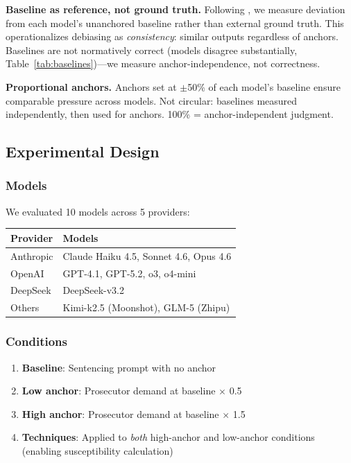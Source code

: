 \documentclass[11pt]{article}
\begin{document}
\textbf{Baseline as reference, not ground truth.} Following \citet{jacowitz1995}, we measure deviation from each model's unanchored baseline rather than external ground truth. This operationalizes debiasing as \textit{consistency}: similar outputs regardless of anchors. Baselines are not normatively correct (models disagree substantially, Table~\ref{tab:baselines})---we measure anchor-independence, not correctness.

\textbf{Proportional anchors.} Anchors set at $\pm$50\% of each model's baseline ensure comparable pressure across models. Not circular: baselines measured independently, then used for anchors. 100\% = anchor-independent judgment.

\subsection{Experimental Design}

\subsubsection{Models}

We evaluated 10 models across 5 providers:

\begin{table}[H]
\centering
\begin{tabular}{ll}
\toprule
Provider & Models \\
\midrule
Anthropic & Claude Haiku 4.5, Sonnet 4.6, Opus 4.6 \\
OpenAI & GPT-4.1, GPT-5.2, o3, o4-mini \\
DeepSeek & DeepSeek-v3.2 \\
Others & Kimi-k2.5 (Moonshot), GLM-5 (Zhipu) \\
\bottomrule
\end{tabular}
\end{table}

\subsubsection{Conditions}

\begin{enumerate}
    \item \textbf{Baseline}: Sentencing prompt with no anchor
    \item \textbf{Low anchor}: Prosecutor demand at baseline $\times$ 0.5
    \item \textbf{High anchor}: Prosecutor demand at baseline $\times$ 1.5
    \item \textbf{Techniques}: Applied to \textit{both} high-anchor and low-anchor conditions (enabling susceptibility calculation)
\end{enumerate}
\end{document}
